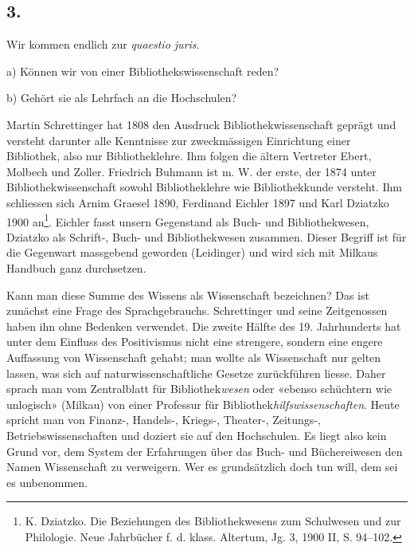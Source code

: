 \documentclass[a4paper,
fontsize=11pt,
oneside,
numbers=noperiodatend,
parskip=half-,
bibliography=totoc,
final
]{scrartcl}
\begin{document}
\subsection*{3.}

Wir kommen endlich zur \emph{quaestio juris}.

a) Können wir von einer Bibliothekswissenschaft reden?

b) Gehört sie als Lehrfach an die Hochschulen?

Martin Schrettinger hat 1808 den Ausdruck Bibliothekwissenschaft geprägt
und versteht darunter alle Kenntnisse zur zweckmässigen Einrichtung
einer Bibliothek, also nur Bibliotheklehre. Ihm folgen die ältern
Vertreter Ebert, Molbech und Zoller. Friedrich Buhmann ist m. W. der
erste, der 1874 unter Bibliothekwissenschaft sowohl Bibliotheklehre wie
Bibliothekkunde versteht. Ihm schliessen sich Arnim Graesel 1890,
Ferdinand Eichler 1897 und Karl Dziatzko 1900 an\footnote{K. Dziatzko.
  Die Beziehungen des Bibliothekwesens zum Schulwesen und zur
  Philologie. Neue Jahrbücher f. d. klass. Altertum, Jg. 3, 1900 II, S.
  94--102.}. Eichler fasst unsern Gegenstand als Buch- und
Bibliothekwesen, Dziatzko als Schrift-, Buch- und Bibliothekwesen
zusammen. Dieser Begriff ist für die Gegenwart massgebend geworden
(Leidinger) und wird sich mit Milkaus Handbuch ganz durchsetzen.

Kann man diese Summe des Wissens als Wissenschaft bezeichnen? Das ist
zunächst eine Frage des Sprachgebrauchs. Schrettinger und seine
Zeitgenossen haben ihn ohne Bedenken verwendet. Die zweite Hälfte des
19. Jahrhunderts hat unter dem Einfluss des Positivismus nicht eine
strengere, sondern eine engere Auffassung von Wissenschaft gehabt; man
wollte als Wissenschaft nur gelten lassen, was sich auf
naturwissenschaftliche Gesetze zurückführen liesse. Daher sprach man vom
Zentralblatt für Bibliothek\emph{wesen} oder «ebenso schüchtern wie
unlogisch» (Milkau) von einer Professur für
Bibliothek\emph{hilfswissenschaften}. Heute spricht man von Finanz-,
Handels-, Kriegs-, Theater-, Zeitungs-, Betriebswissenschaften und
doziert sie auf den Hochschulen. Es liegt also kein Grund vor, dem
System der Erfahrungen über das Buch- und Büchereiwesen den Namen
Wissenschaft zu verweigern. Wer es grundsätzlich doch tun will, dem sei
es unbenommen.
\end{document}
